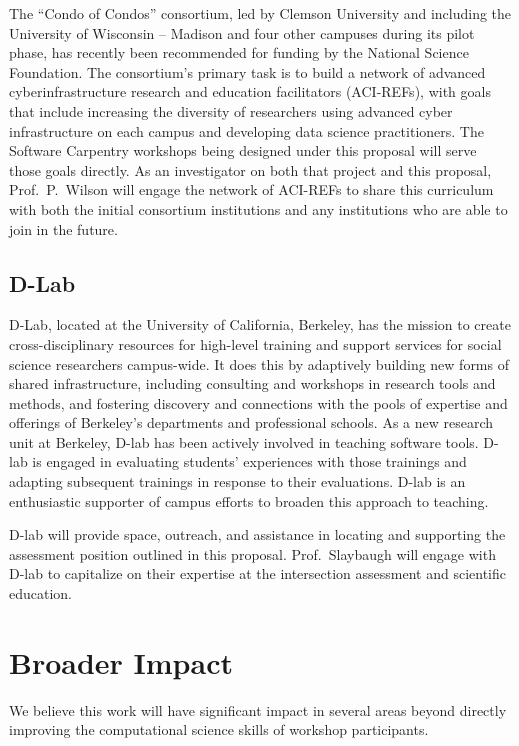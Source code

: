 \documentclass{proposalnsf}
\newlength{\up}
\begin{document}
The ``Condo of Condos'' consortium, led by Clemson University and
including the University of Wisconsin -- Madison and four other
campuses during its pilot phase, has recently been recommended for
funding by the National Science Foundation.  The consortium's primary
task is to build a network of advanced cyberinfrastructure research
and education facilitators (ACI-REFs), with goals that include
increasing the diversity of researchers using advanced cyber
infrastructure on each campus and developing data science
practitioners.  The Software Carpentry workshops being designed under
this proposal will serve those goals directly.  As an investigator on
both that project and this proposal, Prof.\ P.\ Wilson will engage the
network of ACI-REFs to share this curriculum with both the initial
consortium institutions and any institutions who are able to join in
the future.

\subsection{D-Lab}
\label{sec:dlab}

D-Lab, located at the University of California, Berkeley, has the
mission to create cross-disciplinary resources for high-level training
and support services for social science researchers campus-wide. It
does this by adaptively building new forms of shared infrastructure,
including consulting and workshops in research tools and methods, and
fostering discovery and connections with the pools of expertise and
offerings of Berkeley's departments and professional schools. As a new
research unit at Berkeley, D-lab has been actively involved in
teaching software tools. D-lab is engaged in evaluating students’
experiences with those trainings and adapting subsequent trainings in
response to their evaluations. D-lab is an enthusiastic supporter of
campus efforts to broaden this approach to teaching.

D-lab will provide space, outreach, and assistance in locating and
supporting the assessment position outlined in this proposal.
Prof.\ Slaybaugh will engage with D-lab to capitalize on their
expertise at the intersection assessment and scientific education.

\section{Broader Impact}

We believe this work will have significant impact in several areas
beyond directly improving the computational science skills of workshop
participants.
\end{document}
